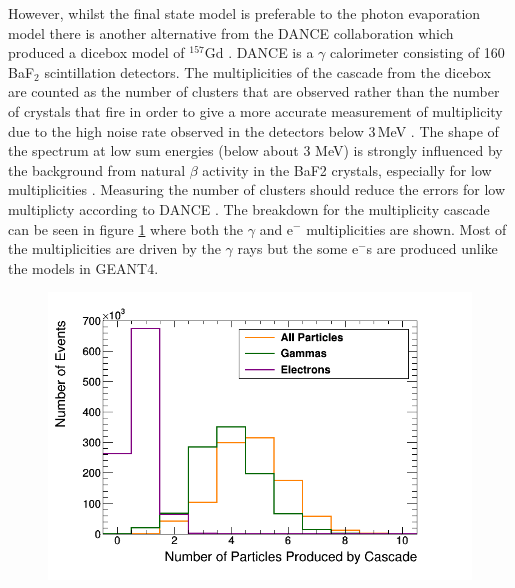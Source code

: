 
However, whilst the final state model is preferable to the photon evaporation model there is another alternative from the DANCE collaboration which produced a dicebox model of $^{157}$Gd \cite{Chyzh_2011}. DANCE is a $\gamma$ calorimeter consisting of 160 BaF$_2$ scintillation detectors. The multiplicities of the cascade from the dicebox are counted as the number of clusters that are observed rather than the number of crystals that fire in order to give a more accurate measurement of multiplicity due to the high noise rate observed in the detectors below 3\,MeV \cite{Chyzh_2011}. The shape of the spectrum at low sum energies (below about 3 MeV) is strongly influenced by the background from natural $\beta$ activity in the BaF2 crystals, especially for low multiplicities \cite{Chyzh_2011}. Measuring the number of clusters should reduce the errors for low multiplicty according to DANCE \cite{Chyzh_2011}. The breakdown for the multiplicity cascade can be seen in figure \ref{fig:gadoliniumMultipliciesBreakdownCascade} where both the $\gamma$ and e$^-$ multiplicities are shown. Most of the multiplicities are driven by the $\gamma$ rays but the some e$^-$s are produced unlike the models in GEANT4. 

\begin{figure}[htbp]
 \centering
 \includegraphics[width=0.7\linewidth]{Chapter4/Figs/Raster/gadolinium/gadoliniumMultipliciesBreakdownCascade.png}
 \label{fig:gadoliniumMultipliciesBreakdownCascade}
\end{figure}

